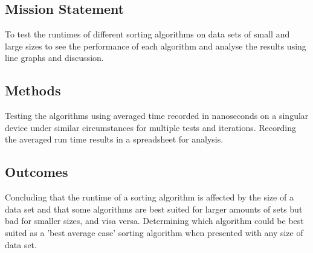 \documentclass{acm_proc_article-sp}
\begin{document}
\subsection{Mission Statement}
To test the runtimes of different sorting algorithms on data sets of small and large
sizes  to see the performance of each algorithm and analyse the results using line graphs and discussion.
\subsection{Methods}
Testing the algorithms using averaged time recorded in nanoseconds on a
singular device under similar circumstances for multiple tests and iterations. Recording the averaged run time results in a spreadsheet for analysis.
\subsection{Outcomes}
Concluding that the runtime of a sorting algorithm is affected by the size of a
data set and that some algorithms are best suited for larger amounts of sets but bad
for smaller sizes, and visa versa. Determining which algorithm could be best suited
as a 'best average case' sorting algorithm when presented with any size of data set.
\end{document}
